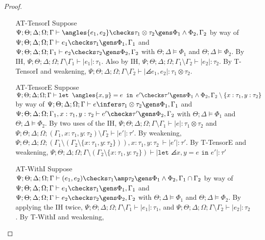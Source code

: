 \begin{proof}
\begin{enumerate}
  \item[AT-TensorI] Suppose $\Psi ; \Theta ; \Delta ; \Omega ; \Gamma\vdash \angles{e_1,e_2} \checks \tau_1 \otimes \tau_2 \gens \Phi_1 \wedge \Phi_2,\Gamma_2$ by way of $\Psi ; \Theta ; \Delta ; \Omega ; \Gamma\vdash e_1 \checks \tau_1 \gens \Phi_1, \Gamma_1$ and $\Psi ; \Theta ; \Delta ; \Omega ; \Gamma_1\vdash e_2 \checks \tau_2 \gens \Phi_2, \Gamma_2$ with $\Theta ; \Delta \vDash \Phi_1$ and $\Theta ; \Delta \vDash \Phi_2$. By IH, $\Psi ; \Theta ; \Delta ; \Omega ; \Gamma \setminus \Gamma_1 \vdash |e_1| : \tau_1$. Also by IH, $\Psi ; \Theta ; \Delta ; \Omega ; \Gamma_1 \setminus \Gamma_2 \vdash |e_2| : \tau_2$. By T-TensorI and weakening, $\Psi ; \Theta ; \Delta ; \Omega ; \Gamma \setminus \Gamma_2\vdash |\angles{e_1,e_2}| : \tau_1 \otimes \tau_2$.
  \item[AT-TensorE] Suppose $\Psi ; \Theta ; \Delta ; \Omega ; \Gamma\vdash \texttt{let } \angles{x,y} = e \texttt{ in } e' \checks \tau' \gens \Phi_1 \wedge \Phi_2, \Gamma_2 \setminus \{x : \tau_1,y : \tau_2\}$ by way of $\Psi ; \Theta ; \Delta ; \Omega ; \Gamma\vdash e \infers \tau_1 \otimes \tau_2 \gens \Phi_1, \Gamma_1$ and $\Psi ; \Theta ; \Delta ; \Omega ; \Gamma_1,x : \tau_1, y : \tau_2\vdash e' \checks \tau' \gens \Phi_2,\Gamma_2$ with $\Theta ; \Delta \vDash \Phi_1$ and $\Theta ; \Delta\vDash \Phi_2$. By two uses of the IH, $\Psi ; \Theta ; \Delta ; \Omega ; \Gamma \setminus \Gamma_1 \vdash |e| : \tau_1 \otimes \tau_2$ and $\Psi ; \Theta ; \Delta ; \Omega ; (\Gamma_1,x : \tau_1, y : \tau_2) \setminus \Gamma_2 \vdash |e'| : \tau'$. By weakening, $\Psi ; \Theta ; \Delta ; \Omega ; (\Gamma_1 \setminus (\Gamma_2 \setminus \{x : \tau_1, y : \tau_2\})),x : \tau_1, y : \tau_2\ \vdash |e'| : \tau'$. By T-TensorE and weakening, $\Psi ; \Theta ; \Delta ; \Omega ; \Gamma\setminus (\Gamma_2 \setminus \{x : \tau_1,y : \tau_2\}) \vdash |\texttt{let } \angles{x,y} = e \texttt{ in } e'| : \tau'$
  \item[AT-WithI] Suppose $\Psi ; \Theta ; \Delta ; \Omega ; \Gamma \vdash (e_1,e_2) \checks \tau_1 \amp \tau_2 \gens \Phi_1 \wedge \Phi_2, \Gamma_1 \cap \Gamma_2$ by way of $\Psi ; \Theta ; \Delta ; \Omega ; \Gamma \vdash e_1 \checks \tau_1 \gens \Phi_1, \Gamma_1$ and $\Psi ; \Theta ; \Delta ; \Omega ; \Gamma \vdash e_2 \checks \tau_2 \gens \Phi_2, \Gamma_2$ with $\Theta ; \Delta \vDash \Phi_1$ and $\Theta ; \Delta \vDash \Phi_2$. By applying the IH twice, $\Psi ; \Theta ; \Delta ; \Omega ; \Gamma \setminus \Gamma_1 \vdash |e_1| : \tau_1$, and $\Psi ; \Theta ; \Delta ; \Omega ; \Gamma \setminus \Gamma_2 \vdash |e_2| : \tau_2$. By T-WithI and weakening,

\end{enumerate}
\end{proof}
